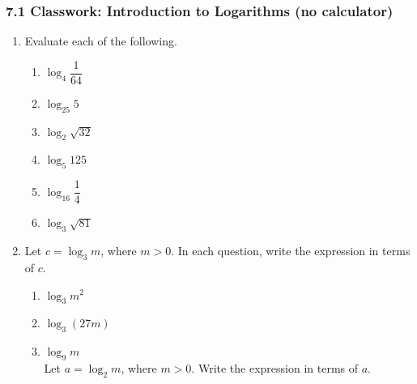 \documentclass[12pt, twoside]{article}
\begin{document}
\subsubsection*{7.1 Classwork: Introduction to Logarithms (no calculator)}

\begin{enumerate}[itemsep=0.25cm]

\item[1.] Evaluate each of the following.

\begin{enumerate}[label=(\alph*), itemsep=1cm]
  \item $\log_4 \dfrac{1}{64}$
  \vspace{0.9cm}

  \item $\log_{25} 5$
  \vspace{0.9cm}

  \item $\log_2 \sqrt{32}$
  \vspace{0.9cm}

  \item $\log_5 125$
  \vspace{0.9cm}

  \item $\log_{16} \dfrac{1}{4}$
  \vspace{0.9cm}

  \item $\log_3 \sqrt{81}$
  \vspace{0.9cm}
\end{enumerate}

\newpage

\item[2.] Let $c = \log_3 m$, where $m > 0$. In each question, write the expression in terms of $c$.

\begin{enumerate}[label=(\alph*), itemsep=1cm]
  \item $\log_3 m^2$
  \vspace{1cm}

  \item $\log_3(27m)$
  \vspace{1cm}

  \item $\log_9 m$
  \vspace{2cm} \\
Let $a = \log_2 m$, where $m > 0$. Write the expression in terms of $a$.


\end{enumerate}
\end{enumerate}
\end{document}
